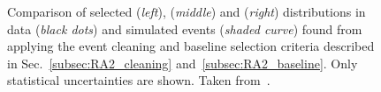 \begin{figure}[!h]
  \centering
{}
  \caption{Comparison of selected \HT (\textit{left}), \MHT (\textit{middle}) and \NJets (\textit{right}) distributions in data (\textit{black dots}) and simulated events (\textit{shaded curve}) found from applying the event cleaning and baseline selection criteria described in Sec.~\ref{subsec:RA2_cleaning} and~\ref{subsec:RA2_baseline}. Only statistical uncertainties are shown. Taken from~\cite{Chatrchyan:2014lfa}.}
  \label{fig:ra2_baseline_mc}
\end{figure}

